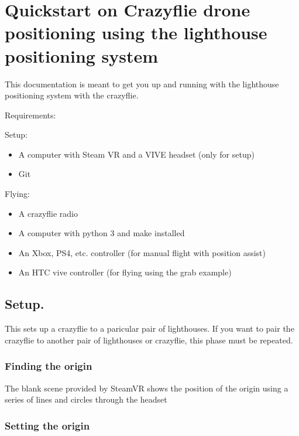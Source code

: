 \hypertarget{quickstart-on-crazyflie-drone-positioning-using-the-lighthouse-positioning-system}{%
\section{Quickstart on Crazyflie drone positioning using the lighthouse
positioning
system}\label{quickstart-on-crazyflie-drone-positioning-using-the-lighthouse-positioning-system}}

This documentation is meant to get you up and running with the
lighthouse positioning system with the crazyflie.

Requirements:

Setup:

\begin{itemize}
\tightlist
\item
  A computer with Steam VR and a VIVE headset (only for setup)
\item
  Git
\end{itemize}

Flying:

\begin{itemize}
\tightlist
\item
  A crazyflie radio
\item
  A computer with python 3 and make installed
\item
  An Xbox, PS4, etc. controller (for manual flight with position assist)
\item
  An HTC vive controller (for flying using the grab example)
\end{itemize}

\hypertarget{setup.}{%
\subsection{Setup.}\label{setup.}}

This sets up a crazyflie to a paricular pair of lighthouses. If you want
to pair the crazyflie to another pair of lighthouses or crazyflie, this
phase must be repeated.

\hypertarget{finding-the-origin}{%
\subsubsection{Finding the origin}\label{finding-the-origin}}

The blank scene provided by SteamVR shows the position of the origin
using a series of lines and circles through the headset

\hypertarget{setting-the-origin}{%
\subsubsection{Setting the origin}\label{setting-the-origin}}

